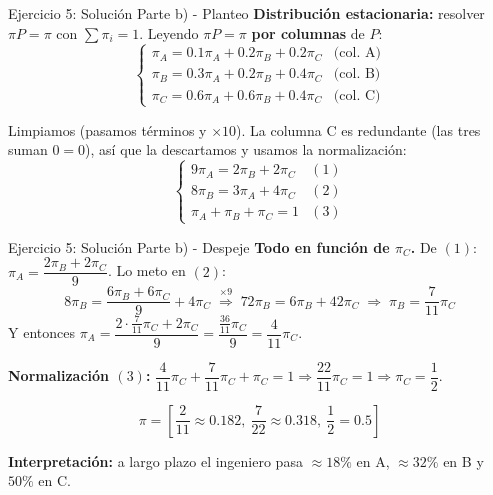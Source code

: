 \documentclass{beamer}
\begin{document}
\begin{frame}{Ejercicio 5: Solución Parte b) - Planteo}
    \small
    \textbf{Distribución estacionaria:} resolver $\pi P = \pi$ con $\sum \pi_i = 1$. Leyendo $\pi P = \pi$ \textbf{por columnas} de $P$:
    \[
    \begin{cases}
    \pi_A = 0.1\pi_A + 0.2\pi_B + 0.2\pi_C & \text{(col. A)} \\
    \pi_B = 0.3\pi_A + 0.2\pi_B + 0.4\pi_C & \text{(col. B)} \\
    \pi_C = 0.6\pi_A + 0.6\pi_B + 0.4\pi_C & \text{(col. C)}
    \end{cases}
    \]

    \vspace{0.3em}

    Limpiamos (pasamos términos y $\times 10$). La columna C es redundante (las tres suman $0=0$), así que la descartamos y usamos la normalización:
    \[
    \begin{cases}
    9\pi_A = 2\pi_B + 2\pi_C & (1) \\
    8\pi_B = 3\pi_A + 4\pi_C & (2) \\
    \pi_A + \pi_B + \pi_C = 1 & (3)
    \end{cases}
    \]
\end{frame}

\begin{frame}{Ejercicio 5: Solución Parte b) - Despeje}
    \small
    \textbf{Todo en función de $\pi_C$.} De $(1)$: $\pi_A = \dfrac{2\pi_B + 2\pi_C}{9}$. Lo meto en $(2)$:
    \[
    8\pi_B = \frac{6\pi_B + 6\pi_C}{9} + 4\pi_C \;\overset{\times 9}{\Longrightarrow}\; 72\pi_B = 6\pi_B + 42\pi_C \;\Rightarrow\; \pi_B = \frac{7}{11}\pi_C
    \]
    Y entonces $\pi_A = \dfrac{2\cdot\frac{7}{11}\pi_C + 2\pi_C}{9} = \dfrac{\frac{36}{11}\pi_C}{9} = \dfrac{4}{11}\pi_C$.

    \vspace{0.4em}

    \textbf{Normalización $(3)$:} $\dfrac{4}{11}\pi_C + \dfrac{7}{11}\pi_C + \pi_C = 1 \Rightarrow \dfrac{22}{11}\pi_C = 1 \Rightarrow \pi_C = \dfrac{1}{2}$.

    \vspace{0.4em}

    \[
    \pi = \left[ \frac{2}{11} \approx 0.182,\ \frac{7}{22} \approx 0.318,\ \frac{1}{2} = 0.5 \right]
    \]

    \textbf{Interpretación:} a largo plazo el ingeniero pasa $\approx 18\%$ en A, $\approx 32\%$ en B y $50\%$ en C.
\end{frame}
\end{document}
